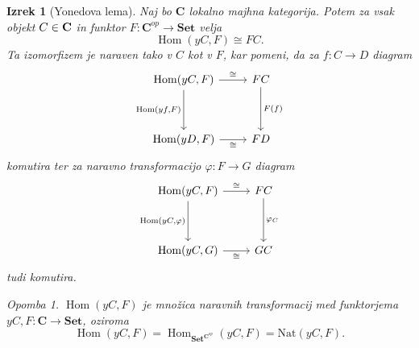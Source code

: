 \documentclass[12pt,a4paper]{book}
\theoremstyle{definition}
\theoremstyle{plain}
\newtheorem{izrek}[definicija]{Izrek}
\theoremstyle{definition}
\theoremstyle{remark}
\newtheorem*{opomba}{Opomba}
\newcommand{\cat}[1]{\textbf{#1}}
\DeclareMathOperator{\Hom}{Hom}
\begin{document}
\begin{izrek}[Yonedova lema]
Naj bo $\cat{C}$ lokalno majhna kategorija. Potem za vsak objekt $C \in \bf{C}$ in funktor $F : \cat{C}^{op} \to \cat{Set}$ velja
$$\Hom(yC,F) \cong FC.$$
Ta izomorfizem je naraven tako v $C$ kot v $F$, kar pomeni, da za $f : C \to D$ diagram
%
\begin{equation} \label{diag1}
\begin{tikzcd}[row sep=huge]
\Hom(yC,F) \arrow[r, "\cong"] \arrow[d, "{\Hom(yf,F)}"'] & FC \arrow[d, "F(f)"] \\
\Hom(yD,F) \arrow[r, "\cong"'] & FD
\end{tikzcd}
\end{equation}
%
komutira ter za naravno transformacijo $\varphi : F \to G$ diagram
%
\begin{equation} \label{diag2}
\begin{tikzcd}[row sep=huge]
\Hom(yC,F) \arrow[r, "\cong"] \arrow[d, "{\Hom(yC,}\varphi\text{)}"'] & FC \arrow[d, "\varphi_C"] \\
\Hom(yC,G) \arrow[r, "\cong"']	&	GC
\end{tikzcd}
\end{equation}
tudi komutira.
%
\begin{opomba}
 $\Hom(yC,F)$ je množica naravnih transformacij med funktorjema $yC,F : \cat{C} \to \cat{Set}$, oziroma 
 $$\Hom(yC,F) = \Hom_{\cat{Set}^{\cat{C}^{op}}}(yC,F) = \mathrm{Nat}(yC,F).$$
\end{opomba}
%
\end{izrek}
\end{document}
